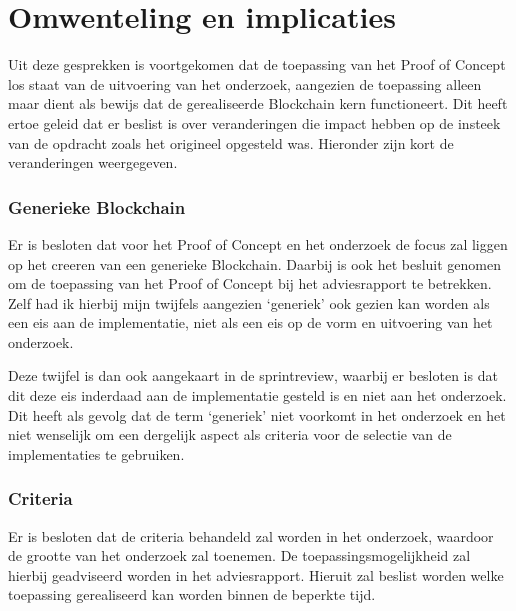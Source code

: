 \section{Omwenteling en implicaties}

Uit deze gesprekken is voortgekomen dat de toepassing van het Proof of Concept los staat van de uitvoering van het onderzoek, aangezien de toepassing alleen maar dient als bewijs dat de gerealiseerde Blockchain kern functioneert. Dit heeft ertoe geleid dat er beslist is over veranderingen die impact hebben op de insteek van de opdracht zoals het origineel opgesteld was. Hieronder zijn kort de veranderingen weergegeven.


\subsubsection{Generieke Blockchain} 
Er is besloten dat voor het Proof of Concept en het onderzoek de focus zal liggen op het creeren van een generieke Blockchain. Daarbij is ook het besluit genomen om de toepassing van het Proof of Concept bij het adviesrapport te betrekken. Zelf had ik hierbij mijn twijfels aangezien `generiek' ook gezien kan worden als een eis aan de implementatie, niet als een eis op de vorm en uitvoering van het onderzoek. 

Deze twijfel is dan ook aangekaart in de sprintreview, waarbij er besloten is dat dit deze eis inderdaad aan de implementatie gesteld is en niet aan het onderzoek. Dit heeft als gevolg dat de term `generiek' niet voorkomt in het onderzoek en het niet wenselijk om een dergelijk aspect als criteria voor de selectie van de implementaties te gebruiken.

\subsubsection{Criteria}

Er is besloten dat de criteria behandeld zal worden in het onderzoek, waardoor de grootte van het onderzoek zal toenemen. De toepassingsmogelijkheid zal hierbij geadviseerd worden in het adviesrapport. Hieruit zal beslist worden welke toepassing gerealiseerd kan worden binnen de beperkte tijd.